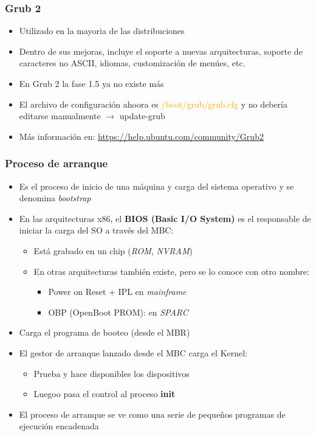 \begin{frame}
	\frametitle{Grub 2}
	\begin{itemize}
		\item Utilizado en la mayoria de las distribuciones
		\item Dentro de sus mejoras, incluye el soporte a nuevas arquitecturas, soporte de caracteres no ASCII, idiomas, customización de menúes, etc.
		\item En Grub 2 la fase 1.5 ya no existe más
		\item El archivo de configuración ahoora es \textcolor{orange}{/boot/grub/grub.cfg} y no debería editarse manualmente $\rightarrow$ update-grub
		\item Más información en: \url{https://help.ubuntu.com/community/Grub2}
	\end{itemize}
\end{frame}

\begin{frame}
	\frametitle{Proceso de arranque}
	\begin{itemize}
		\item Es el proceso de inicio de una máquina y carga del sistema operativo y se denomina \textit{bootstrap}
		\item En las arquitecturas x86, el \textbf{BIOS (Basic I/O System)} es el responsable de iniciar la carga del SO a través del MBC:
		\begin{itemize}
			\item Está grabado en un chip (\emph{ROM}, \emph{NVRAM})
			\item En otras arquitecturas también existe, pero se lo conoce con otro nombre:
			\begin{itemize}
				\item Power on Reset + IPL en \textit{mainframe}
				\item OBP (OpenBoot PROM): en \textit{SPARC}
			\end{itemize}
		\end{itemize}
		\item Carga el programa de booteo (desde el MBR)
		\item El gestor de arranque lanzado desde el MBC carga el Kernel:
		\begin{itemize}
			\item Prueba y hace disponibles los dispositivos
			\item Luegoo pasa el control al proceso \textbf{init}
		\end{itemize}
		\item El proceso de arranque se ve como una serie de pequeños programas de ejecución encadenada
	\end{itemize}
\end{frame}

